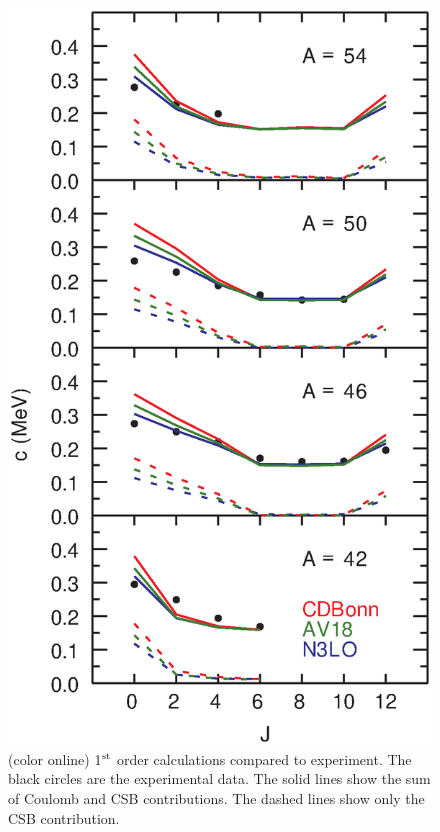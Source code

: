 \documentclass[10pt,showpacs,preprintnumbers,footinbib,amsmath,amssymb,aps,prl,twocolumn,groupedaddress,superscriptaddress,showkeys]{revtex4-1}
\begin{document}
\begin{figure}
\includegraphics[scale=0.35]{c1.eps}
\caption{(color online) 1$^{\rm st}$ order calculations compared to
experiment. The black circles
are the experimental data. The solid lines show the sum of Coulomb and
CSB
contributions. The dashed lines show only the CSB contribution.}
\end{figure}
\end{document}

